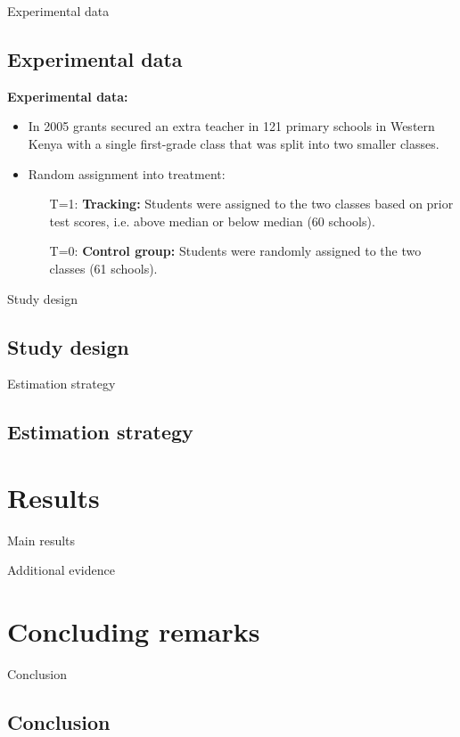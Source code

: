 \documentclass[9pt]{beamer}
\numberwithin{equation}{section}
\begin{document}
\begin{frame}{Experimental data}
  \subsection{Experimental data}
  \textbf{Experimental data:}
  \begin{itemize}
    \item In 2005 grants secured an extra teacher in 121 primary schools in Western Kenya with a single first-grade class that was split into two smaller classes.
    \item Random assignment into treatment:
    \begin{itemize}
      \item[T=1:] \textbf{Tracking:} Students were assigned to the two classes based on prior test scores, i.e. above median or below median (60 schools).
      \item[T=0:] \textbf{Control group:} Students were randomly assigned to the two classes (61 schools).
    \end{itemize}
  \end{itemize}
\end{frame}

\begin{frame}{Study design}
  \subsection{Study design}
\end{frame}


\begin{frame}{Estimation strategy}
  \subsection{Estimation strategy}
\end{frame}


\section{Results}


\begin{frame}{Main results}
\end{frame}



\begin{frame}{Additional evidence}
\end{frame}


\section{Concluding remarks}
\begin{frame}{Conclusion}
  \subsection{Conclusion}
\end{frame}
\end{document}
